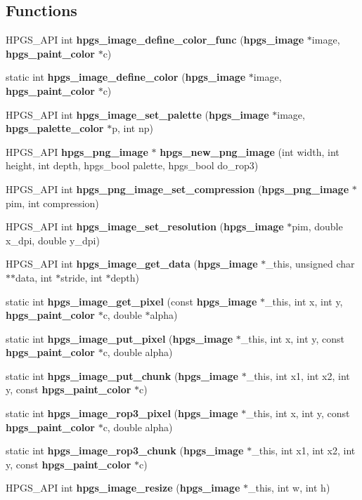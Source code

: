 \subsection*{Functions}
\begin{DoxyCompactItemize}
\item 
HPGS\_\-API int {\bf hpgs\_\-image\_\-define\_\-color\_\-func} ({\bf hpgs\_\-image} $\ast$image, {\bf hpgs\_\-paint\_\-color} $\ast$c)
\item 
static int {\bf hpgs\_\-image\_\-define\_\-color} ({\bf hpgs\_\-image} $\ast$image, {\bf hpgs\_\-paint\_\-color} $\ast$c)
\item 
HPGS\_\-API int {\bf hpgs\_\-image\_\-set\_\-palette} ({\bf hpgs\_\-image} $\ast$image, {\bf hpgs\_\-palette\_\-color} $\ast$p, int np)
\item 
HPGS\_\-API {\bf hpgs\_\-png\_\-image} $\ast$ {\bf hpgs\_\-new\_\-png\_\-image} (int width, int height, int depth, hpgs\_\-bool palette, hpgs\_\-bool do\_\-rop3)
\item 
HPGS\_\-API int {\bf hpgs\_\-png\_\-image\_\-set\_\-compression} ({\bf hpgs\_\-png\_\-image} $\ast$pim, int compression)
\item 
HPGS\_\-API int {\bf hpgs\_\-image\_\-set\_\-resolution} ({\bf hpgs\_\-image} $\ast$pim, double x\_\-dpi, double y\_\-dpi)
\item 
HPGS\_\-API int {\bf hpgs\_\-image\_\-get\_\-data} ({\bf hpgs\_\-image} $\ast$\_\-this, unsigned char $\ast$$\ast$data, int $\ast$stride, int $\ast$depth)
\item 
static int {\bf hpgs\_\-image\_\-get\_\-pixel} (const {\bf hpgs\_\-image} $\ast$\_\-this, int x, int y, {\bf hpgs\_\-paint\_\-color} $\ast$c, double $\ast$alpha)
\item 
static int {\bf hpgs\_\-image\_\-put\_\-pixel} ({\bf hpgs\_\-image} $\ast$\_\-this, int x, int y, const {\bf hpgs\_\-paint\_\-color} $\ast$c, double alpha)
\item 
static int {\bf hpgs\_\-image\_\-put\_\-chunk} ({\bf hpgs\_\-image} $\ast$\_\-this, int x1, int x2, int y, const {\bf hpgs\_\-paint\_\-color} $\ast$c)
\item 
static int {\bf hpgs\_\-image\_\-rop3\_\-pixel} ({\bf hpgs\_\-image} $\ast$\_\-this, int x, int y, const {\bf hpgs\_\-paint\_\-color} $\ast$c, double alpha)
\item 
static int {\bf hpgs\_\-image\_\-rop3\_\-chunk} ({\bf hpgs\_\-image} $\ast$\_\-this, int x1, int x2, int y, const {\bf hpgs\_\-paint\_\-color} $\ast$c)
\item 
HPGS\_\-API int {\bf hpgs\_\-image\_\-resize} ({\bf hpgs\_\-image} $\ast$\_\-this, int w, int h)
$$
\end{DoxyCompactItemize}
